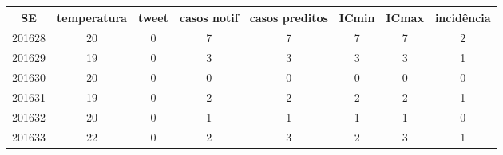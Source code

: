 \begin{tabular}{c|ccccccc}
  \hline
SE & temperatura & tweet & casos notif & casos preditos & ICmin & ICmax & incidência \\ 
  \hline
201628 & 20 & 0 & 7 & 7 & 7 & 7 & 2 \\ 
  201629 & 19 & 0 & 3 & 3 & 3 & 3 & 1 \\ 
  201630 & 20 & 0 & 0 & 0 & 0 & 0 & 0 \\ 
  201631 & 19 & 0 & 2 & 2 & 2 & 2 & 1 \\ 
  201632 & 20 & 0 & 1 & 1 & 1 & 1 & 0 \\ 
  201633 & 22 & 0 & 2 & 3 & 2 & 3 & 1 \\ 
   \hline
\end{tabular}
